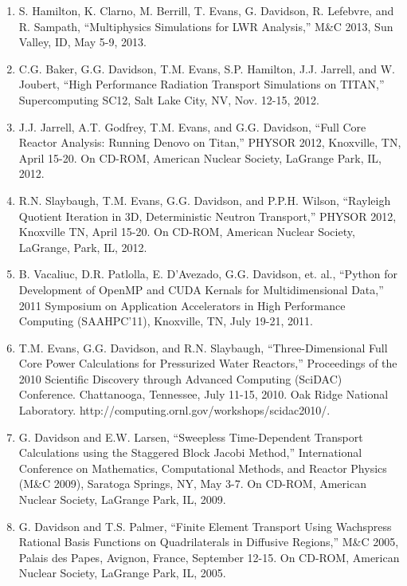 \documentclass[letterpaper,11pt]{article}
\begin{document}
\begin{enumerate}
  \item S. Hamilton, K. Clarno, M. Berrill, T. Evans, G. Davidson,
    R. Lefebvre, and R. Sampath, ``Multiphysics Simulations for LWR
    Analysis,'' M\&C 2013, Sun Valley, ID, May 5-9, 2013.
  \item C.G. Baker, G.G. Davidson, T.M. Evans, S.P. Hamilton,
    J.J. Jarrell, and W. Joubert, ``High Performance Radiation
    Transport Simulations on TITAN,'' Supercomputing SC12, Salt Lake
    City, NV, Nov. 12-15, 2012.
  \item J.J. Jarrell, A.T. Godfrey, T.M. Evans, and G.G. Davidson,
    ``Full Core Reactor Analysis: Running Denovo on Titan,'' PHYSOR
    2012, Knoxville, TN, April 15-20. On CD-ROM, American Nuclear
    Society, LaGrange Park, IL, 2012.
  \item R.N. Slaybaugh, T.M. Evans, G.G. Davidson, and P.P.H. Wilson,
    ``Rayleigh Quotient Iteration in 3D, Deterministic Neutron
    Transport,'' PHYSOR 2012, Knoxville TN, April 15-20.  On CD-ROM,
    American Nuclear Society, LaGrange, Park, IL, 2012.
  \item B. Vacaliuc, D.R. Patlolla, E. D'Avezado, G.G. Davidson,
    et. al., ``Python for Development of OpenMP and CUDA Kernals for
    Multidimensional Data,'' 2011 Symposium on Application Accelerators
    in High Performance Computing (SAAHPC'11), Knoxville, TN, July
    19-21, 2011.
  \item T.M. Evans, G.G. Davidson, and R.N. Slaybaugh,
    ``Three-Dimensional Full Core Power Calculations for Pressurized
    Water Reactors,'' Proceedings of the 2010 Scientific Discovery
    through Advanced Computing (SciDAC) Conference. Chattanooga,
    Tennessee, July 11-15, 2010. Oak Ridge National
    Laboratory. http://computing.ornl.gov/workshops/scidac2010/.
  \item G. Davidson and E.W. Larsen, ``Sweepless Time-Dependent
    Transport Calculations using the Staggered Block Jacobi Method,''
    International Conference on Mathematics, Computational Methods,
    and Reactor Physics (M\&C 2009), Saratoga Springs, NY, May 3-7.  On
    CD-ROM, American Nuclear Society, LaGrange Park, IL, 2009.
  \item G. Davidson and T.S. Palmer, ``Finite Element Transport Using
    Wachspress Rational Basis Functions on Quadrilaterals in Diffusive
    Regions,'' M\&C 2005, Palais des Papes, Avignon, France, September
    12-15.  On CD-ROM, American Nuclear Society, LaGrange Park, IL,
    2005.
\end{enumerate}
\end{document}
